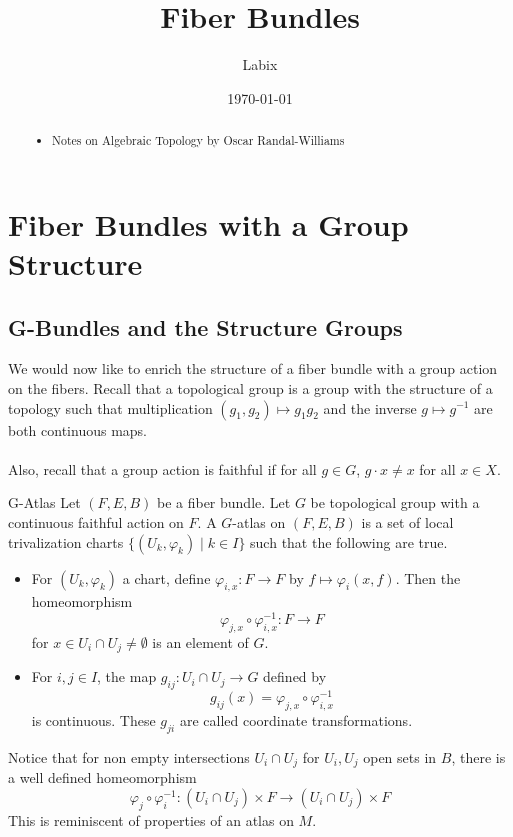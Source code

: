 \documentclass[a4paper]{article}
\title{Fiber Bundles}
\author{Labix}
\date{\today}
\begin{document}
\maketitle
\begin{abstract}
\begin{itemize}
\item Notes on Algebraic Topology by Oscar Randal-Williams
\end{itemize}
\end{abstract}
\pagebreak
\tableofcontents

\pagebreak
\section{Fiber Bundles with a Group Structure}
\subsection{G-Bundles and the Structure Groups}
We would now like to enrich the structure of a fiber bundle with a group action on the fibers. Recall that a topological group is a group with the structure of a topology such that multiplication $(g_1,g_2)\mapsto g_1g_2$ and the inverse $g\mapsto g^{-1}$ are both continuous maps. \\~\\

Also, recall that a group action is faithful if for all $g\in G$, $g\cdot x\neq x$ for all $x\in X$. 

\begin{defn}{G-Atlas}{} Let $(F,E,B)$ be a fiber bundle. Let $G$ be topological group with a continuous faithful action on $F$. A $G$-atlas on $(F,E,B)$ is a set of local trivalization charts $\{(U_k,\varphi_k)\;|\;k\in I\}$ such that the following are true. 
\begin{itemize}
\item For $(U_k,\varphi_k)$ a chart, define $\varphi_{i,x}:F\to F$ by $f\mapsto\varphi_i(x,f)$. Then the homeomorphism $$\varphi_{j,x}\circ\varphi_{i,x}^{-1}:F\to F$$ for $x\in U_i\cap U_j\neq\emptyset$ is an element of $G$. 
\item For $i,j\in I$, the map $g_{ij}:U_i\cap U_j\to G$ defined by $$g_{ij}(x)=\varphi_{j,x}\circ\varphi_{i,x}^{-1}$$ is continuous. These $g_{ji}$ are called coordinate transformations. 
\end{itemize}
\end{defn}

Notice that for non empty intersections $U_i\cap U_j$ for $U_i,U_j$ open sets in $B$, there is a well defined homeomorphism $$\varphi_j\circ\varphi_i^{-1}:(U_i\cap U_j)\times F\to(U_i\cap U_j)\times F$$ This is reminiscent of properties of an atlas on $M$. 
\end{document}

